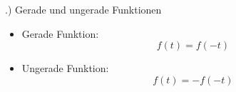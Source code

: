 \documentclass[t,14pt]{beamer}
\begin{document}
\begin{frame}{\thesection .) Gerade und ungerade Funktionen}
    \begin{itemize}
        \item \alert{Gerade Funktion:} 
        \[
        f(t)=f(-t)
        \]
        \begin{center}
        \end{center}
        \item \alert{Ungerade Funktion:} 
        \[
        f(t)=-f(-t)
        \]
        \begin{center}
        \end{center}
    \end{itemize}
\end{frame}

\end{document}
